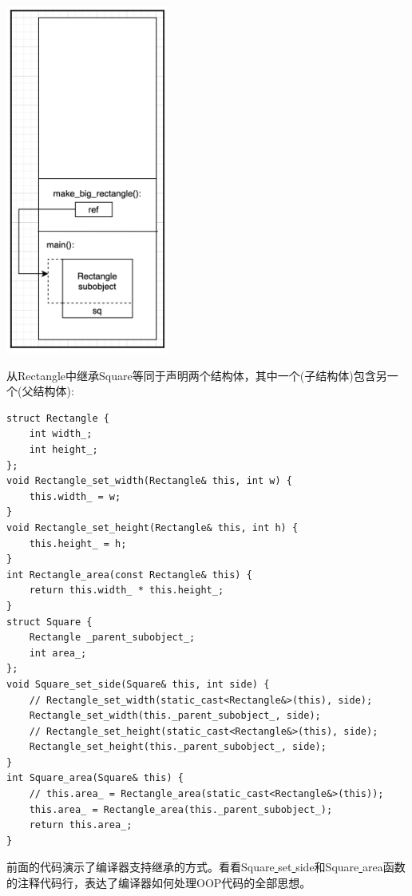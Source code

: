 \begin{center}
	\includegraphics[width=0.4\textwidth]{content/Section-1/Chapter-3/16}
\end{center}

从Rectangle中继承Square等同于声明两个结构体，其中一个(子结构体)包含另一个(父结构体): \par

\begin{lstlisting}[caption={}]
struct Rectangle {
	int width_;
	int height_;
};
void Rectangle_set_width(Rectangle& this, int w) {
	this.width_ = w;
}
void Rectangle_set_height(Rectangle& this, int h) {
	this.height_ = h;
}
int Rectangle_area(const Rectangle& this) {
	return this.width_ * this.height_;
}
struct Square {
	Rectangle _parent_subobject_;
	int area_;
};
void Square_set_side(Square& this, int side) {
	// Rectangle_set_width(static_cast<Rectangle&>(this), side);
	Rectangle_set_width(this._parent_subobject_, side);
	// Rectangle_set_height(static_cast<Rectangle&>(this), side);
	Rectangle_set_height(this._parent_subobject_, side);
}
int Square_area(Square& this) {
	// this.area_ = Rectangle_area(static_cast<Rectangle&>(this));
	this.area_ = Rectangle_area(this._parent_subobject_);
	return this.area_;
}
\end{lstlisting}

前面的代码演示了编译器支持继承的方式。看看Square\underline{ }set\underline{ }side和Square\underline{ }area函数的注释代码行，表达了编译器如何处理OOP代码的全部思想。 \par


